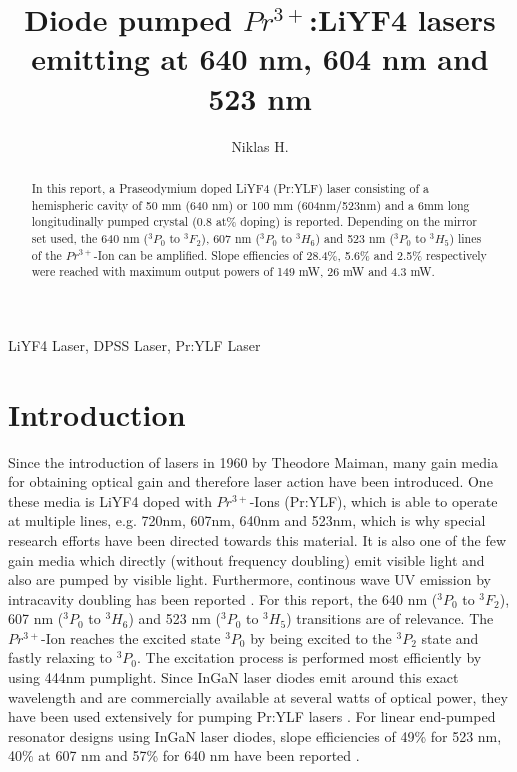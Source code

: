 \documentclass[conference]{IEEEtran}
\begin{document}
\title{Diode pumped $Pr^{3+}$:LiYF4 lasers emitting at 640 nm, 604 nm and 523 nm\\
}

\author{Niklas H.}

\maketitle

\begin{abstract}
In this report, a Praseodymium doped LiYF4 (Pr:YLF) laser consisting of a hemispheric cavity of 50 mm (640 nm) or 100 mm (604nm/523nm) and a 6mm long longitudinally pumped crystal (0.8 at\% doping) is reported. Depending on the mirror set used, the 640 nm ($^3P_0$ to $^3F_2$), 607 nm ($^3P_0$ to $^3H_6$) and 523 nm ($^3P_0$ to $^3H_5$) lines of the $Pr^{3+}$-Ion can be amplified. Slope effiencies of 28.4\%, 5.6\% and 2.5\% respectively were reached with maximum output powers of 149 mW, 26 mW  and 4.3 mW.
\end{abstract}

\begin{IEEEkeywords}
LiYF4 Laser, DPSS Laser, Pr:YLF Laser
\end{IEEEkeywords}
\section{Introduction}

Since the introduction of lasers in 1960 by Theodore Maiman, many gain media for obtaining optical gain and therefore laser action have been introduced. One these media is LiYF4 doped with $Pr^{3+}$-Ions (Pr:YLF), which is able to operate at multiple lines, e.g. 720nm, 607nm, 640nm and 523nm, which is why special research efforts have been directed towards this material. It is also one of the few gain media which directly (without frequency doubling) emit visible light and also are pumped by visible light. Furthermore, continous wave UV emission by intracavity doubling has been reported \cite{Richter.2006}\cite{Gun.2011}. For this report, the 640 nm ($^3P_0$ to $^3F_2$), 607 nm ($^3P_0$ to $^3H_6$) and 523 nm ($^3P_0$ to $^3H_5$) transitions are of relevance. The $Pr^{3+}$-Ion reaches the excited state $^3P_0$ by being excited to the $^3P_2$ state and fastly relaxing to $^3P_0$. The excitation process is performed most efficiently by using 444nm pumplight. Since InGaN laser diodes emit around this exact wavelength and are commercially available at several watts of optical power, they have been used extensively for pumping Pr:YLF lasers \cite{Xu.2013}\cite{Krankel.2016}\cite{Bellancourt.2010}\cite{Luo.2018}\cite{Muller.2011}. For linear end-pumped resonator designs using InGaN laser diodes, slope efficiencies of 49\% for 523 nm, 40\% at 607 nm and 57\% for 640 nm have been reported \cite{Luo.2016}. 
\end{document}
